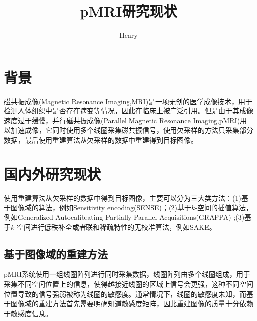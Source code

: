 \documentclass[lang=cn,11pt,a4paper,cite=numbers]{elegantpaper}
\title{pMRI研究现状}
\author{Henry}
\date{\zhtoday}
\begin{document}
\maketitle
\section{背景}
\par 磁共振成像(Magnetic Resonance Imaging,MRI)是一项无创的医学成像技术，用于检测人体组织中是否存在病变等情况，因此在临床上被广泛引用。但是由于其成像速度过于缓慢，并行磁共振成像(Parallel Magnetic Resonance Imaging,pMRI)用以加速成像，它同时使用多个线圈采集磁共振信号，使用欠采样的方法只采集部分数据，最后使用重建算法从欠采样的数据中重建得到目标图像。
\section{国内外研究现状}
\par 使用重建算法从欠采样的数据中得到目标图像，主要可以分为三大类方法：(1)基于图像域的算法，例如Sensitivity encoding(SENSE)\cite{pruessmann1999sense}；(2)基于$k$-空间的插值算法，例如Generalized Autocalibrating Partially Parallel Acquisitions(GRAPPA) \cite{griswold2002generalized};(3)基于$k$-空间进行低秩补全或者联和稀疏特性的无校准算法，例如SAKE\cite{2015Calibrationless}。

\subsection{基于图像域的重建方法}
\par pMRI系统使用一组线圈阵列进行同时采集数据，线圈阵列由多个线圈组成，用于采集不同空间位置上的信息，使得越接近线圈的区域上信号会更强，这种不同空间位置导致的信号强弱被称为线圈的敏感度。通常情况下，线圈的敏感度未知，而基于图像域的重建方法首先需要明确知道敏感度矩阵，因此重建图像的质量十分依赖于敏感度信息。
\end{document}
